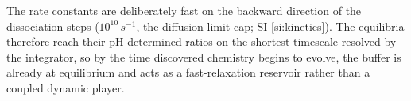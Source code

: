 The rate constants are deliberately fast on the backward direction of the dissociation steps ($10^{10}\,\si{s^{-1}}$, the diffusion-limit cap; SI-\ref{si:kinetics}). The equilibria therefore reach their pH-determined ratios on the shortest timescale resolved by the integrator, so by the time discovered chemistry begins to evolve, the buffer is already at equilibrium and acts as a fast-relaxation reservoir rather than a coupled dynamic player.

